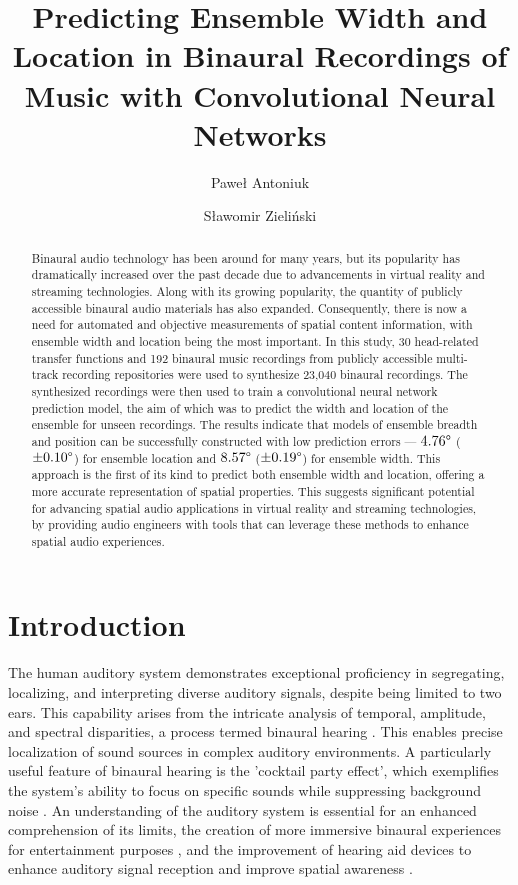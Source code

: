 \documentclass{article}
\title{Predicting Ensemble Width and Location in Binaural Recordings of Music with Convolutional Neural Networks}
\author[1,*]{Paweł Antoniuk}
\author[1]{Sławomir Zieliński}
\affil[1]{Faculty of Computer Science, Białystok University of Technology}
\affil[*]{Corresponding author: pawel.antoniuk@sd.pb.edu.pl}
\date{}
\begin{document}
\maketitle

\begin{abstract}
  Binaural audio technology has been around for many years, but its popularity has dramatically increased over the past decade due to advancements in virtual reality and streaming technologies. Along with its growing popularity, the quantity of publicly accessible binaural audio materials has also expanded. Consequently, there is now a need for automated and objective measurements of spatial content information, with ensemble width and location being the most important. In this study, 30 head-related transfer functions and 192 binaural music recordings from publicly accessible multi-track recording repositories were used to synthesize 23,040 binaural recordings. The synthesized recordings were then used to train a convolutional neural network prediction model, the aim of which was to predict the width and location of the ensemble for unseen recordings. The results indicate that models of ensemble breadth and position can be successfully constructed with low prediction errors --- $4.76\degree$ ($\pm0.10\degree$) for ensemble location and $8.57\degree$ ($\pm0.19\degree$) for ensemble width. This approach is the first of its kind to predict both ensemble width and location, offering a more accurate representation of spatial properties. This suggests significant potential for advancing spatial audio applications in virtual reality and streaming technologies, by providing audio engineers with tools that can leverage these methods to enhance spatial audio experiences.
\end{abstract}

\section{Introduction}

The human auditory system demonstrates exceptional proficiency in segregating, localizing, and interpreting diverse auditory signals, despite being limited to two ears. This capability arises from the intricate analysis of temporal, amplitude, and spectral disparities, a process termed binaural hearing \cite{blauert_spatial_1996}. This enables precise localization of sound sources in complex auditory environments. A particularly useful feature of binaural hearing is the 'cocktail party effect', which exemplifies the system's ability to focus on specific sounds while suppressing background noise \cite{cherry_experiments_1953}. An understanding of the auditory system is essential for an enhanced comprehension of its limits, the creation of more immersive binaural experiences for entertainment purposes \cite{zhang_surround_2017}, and the improvement of hearing aid devices to enhance auditory signal reception and improve spatial awareness \cite{thiemann_speech_2016}.
\end{document}
